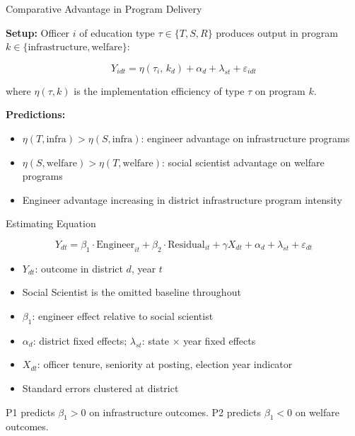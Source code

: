 \documentclass[aspectratio=169]{beamer}
\begin{document}
\begin{frame}{Comparative Advantage in Program Delivery}

\textbf{Setup:} Officer $i$ of education type $\tau \in \{T, S, R\}$ produces output in program $k \in \{\text{infrastructure}, \text{welfare}\}$:

$$Y_{idt} = \eta(\tau_i,\, k_d) + \alpha_d + \lambda_{st} + \varepsilon_{idt}$$

where $\eta(\tau, k)$ is the implementation efficiency of type $\tau$ on program $k$.

\bigskip

\textbf{Predictions:}
\begin{itemize}
    \item[\textbf{P1}] $\eta(T, \text{infra}) > \eta(S, \text{infra})$: engineer advantage on infrastructure programs
    \item[\textbf{P2}] $\eta(S, \text{welfare}) > \eta(T, \text{welfare})$: social scientist advantage on welfare programs
    \item[\textbf{P3}] Engineer advantage increasing in district infrastructure program intensity
\end{itemize}

\bigskip


\end{frame}

\begin{frame}{Estimating Equation}

$$Y_{dt} = \beta_1 \cdot \text{Engineer}_{it} + \beta_2 \cdot \text{Residual}_{it} + \gamma X_{dt} + \alpha_d + \lambda_{st} + \varepsilon_{dt}$$

\medskip

\begin{itemize}
    \item $Y_{dt}$: outcome in district $d$, year $t$
    \item Social Scientist is the omitted baseline throughout
    \item $\beta_1$: engineer effect relative to social scientist
    \item $\alpha_d$: district fixed effects; $\lambda_{st}$: state $\times$ year fixed effects
    \item $X_{dt}$: officer tenure, seniority at posting, election year indicator
    \item Standard errors clustered at district
\end{itemize}

\bigskip

P1 predicts $\beta_1 > 0$ on infrastructure outcomes. P2 predicts $\beta_1 < 0$ on welfare outcomes.

\end{frame}
\end{document}
